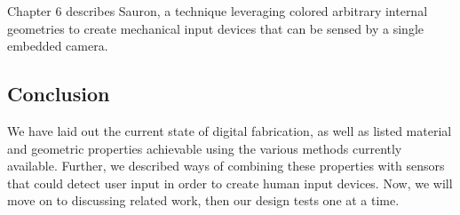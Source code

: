     Chapter 6 describes Sauron, a technique leveraging colored arbitrary internal geometries to create mechanical input devices that can be sensed by a single embedded camera.

\subsection{Conclusion}

We have laid out the current state of digital fabrication, as well as listed material and geometric properties achievable using the various methods currently available. Further, we described ways of combining these properties with sensors that could detect user input in order to create human input devices. Now, we will move on to discussing related work, then our design tests one at a time.